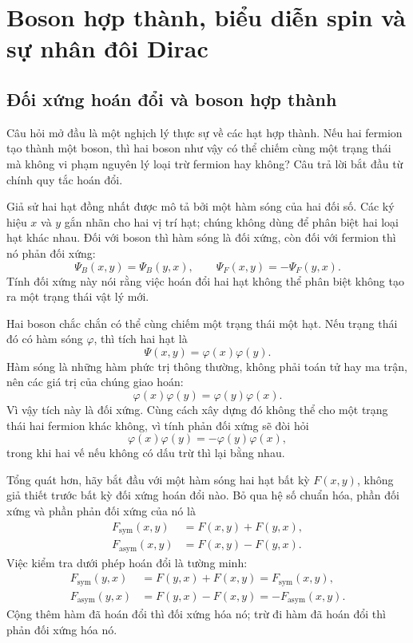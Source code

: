 \chapter{Boson hợp thành, biểu diễn spin và sự nhân đôi Dirac}

\section{Đối xứng hoán đổi và boson hợp thành}

Câu hỏi mở đầu là một nghịch lý thực sự về các hạt hợp thành. Nếu hai fermion tạo thành một boson, thì hai boson như vậy có thể chiếm cùng một trạng thái mà không vi phạm nguyên lý loại trừ fermion hay không? Câu trả lời bắt đầu từ chính quy tắc hoán đổi.

Giả sử hai hạt đồng nhất được mô tả bởi một hàm sóng của hai đối số. Các ký hiệu \(x\) và \(y\) gắn nhãn cho hai vị trí hạt; chúng không dùng để phân biệt hai loại hạt khác nhau. Đối với boson thì hàm sóng là đối xứng, còn đối với fermion thì nó phản đối xứng:
\begin{equation}
\Psi_B(x,y)=\Psi_B(y,x),
\qquad
\Psi_F(x,y)=-\Psi_F(y,x).
\end{equation}
Tính đối xứng này nói rằng việc hoán đổi hai hạt không thể phân biệt không tạo ra một trạng thái vật lý mới.

Hai boson chắc chắn có thể cùng chiếm một trạng thái một hạt. Nếu trạng thái đó có hàm sóng \(\varphi\), thì tích hai hạt là
\begin{equation}
\Psi(x,y)=\varphi(x)\varphi(y).
\end{equation}
Hàm sóng là những hàm phức trị thông thường, không phải toán tử hay ma trận, nên các giá trị của chúng giao hoán:
\begin{equation}
\varphi(x)\varphi(y)=\varphi(y)\varphi(x).
\end{equation}
Vì vậy tích này là đối xứng. Cùng cách xây dựng đó không thể cho một trạng thái hai fermion khác không, vì tính phản đối xứng sẽ đòi hỏi
\begin{equation}
\varphi(x)\varphi(y)=-\varphi(y)\varphi(x),
\end{equation}
trong khi hai vế nếu không có dấu trừ thì lại bằng nhau.

Tổng quát hơn, hãy bắt đầu với một hàm sóng hai hạt bất kỳ \(F(x,y)\), không giả thiết trước bất kỳ đối xứng hoán đổi nào. Bỏ qua hệ số chuẩn hóa, phần đối xứng và phần phản đối xứng của nó là
\begin{align}
F_{\mathrm{sym}}(x,y)&=F(x,y)+F(y,x),\\
F_{\mathrm{asym}}(x,y)&=F(x,y)-F(y,x).
\end{align}
Việc kiểm tra dưới phép hoán đổi là tường minh:
\begin{align}
F_{\mathrm{sym}}(y,x)
&=F(y,x)+F(x,y)
=F_{\mathrm{sym}}(x,y),\\
F_{\mathrm{asym}}(y,x)
&=F(y,x)-F(x,y)
=-F_{\mathrm{asym}}(x,y).
\end{align}
Cộng thêm hàm đã hoán đổi thì đối xứng hóa nó; trừ đi hàm đã hoán đổi thì phản đối xứng hóa nó.

